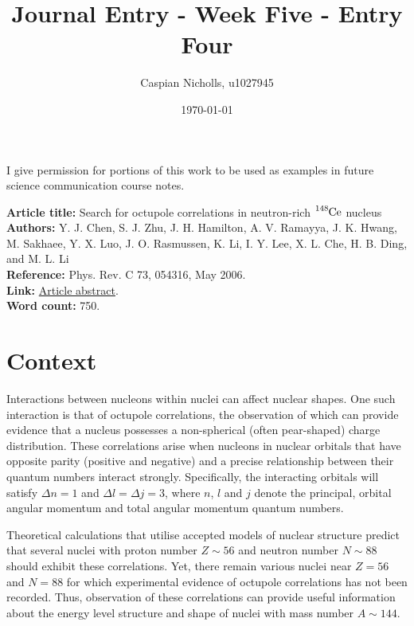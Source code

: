 \documentclass[12pt,a4paper]{article}
\begin{document}
\title{Journal Entry - Week Five - Entry Four}
\author{Caspian Nicholls, u1027945}
\date{\today}

\maketitle

\noindent
I give permission for portions of this work to be used as examples in future science communication course notes.

\medskip
\noindent
\textbf{Article title:} Search for octupole correlations in neutron-rich $\ce{^{148}Ce}$ nucleus \\
\textbf{Authors:} Y. J. Chen, S. J. Zhu, J. H. Hamilton, A. V. Ramayya, J. K. Hwang, M. Sakhaee, Y. X. Luo, J. O. Rasmussen, K. Li, I. Y. Lee, X. L. Che, H. B. Ding, and M. L. Li \\
\textbf{Reference:} Phys. Rev. C 73, 054316, May 2006. \\
\textbf{Link:}  \href{10.1103/PhysRevC.73.054316}{Article abstract}. \\
\textbf{Word count:} 750.

\section*{Context}
Interactions between nucleons within nuclei can affect nuclear shapes. One such interaction is that of octupole correlations, the observation of which can provide evidence that a nucleus possesses a non-spherical (often pear-shaped) charge distribution. These correlations arise when nucleons in nuclear orbitals that have opposite parity (positive and negative) and a precise relationship between their quantum numbers interact strongly. Specifically, the interacting orbitals will satisfy $\Delta n = 1$ and $\Delta l = \Delta j = 3$, where $n$, $l$ and $j$ denote the principal, orbital angular momentum and total angular momentum quantum numbers.

\medskip
Theoretical calculations that utilise accepted models of nuclear structure predict that several nuclei with proton number $Z \sim 56$ and neutron number $N \sim 88$ should exhibit these correlations. Yet, there remain various nuclei near $Z = 56$ and $N = 88$ for which experimental evidence of octupole correlations has not been recorded. Thus, observation of these correlations can provide useful information about the energy level structure and shape of nuclei with mass number $A\sim144$.
\end{document}
